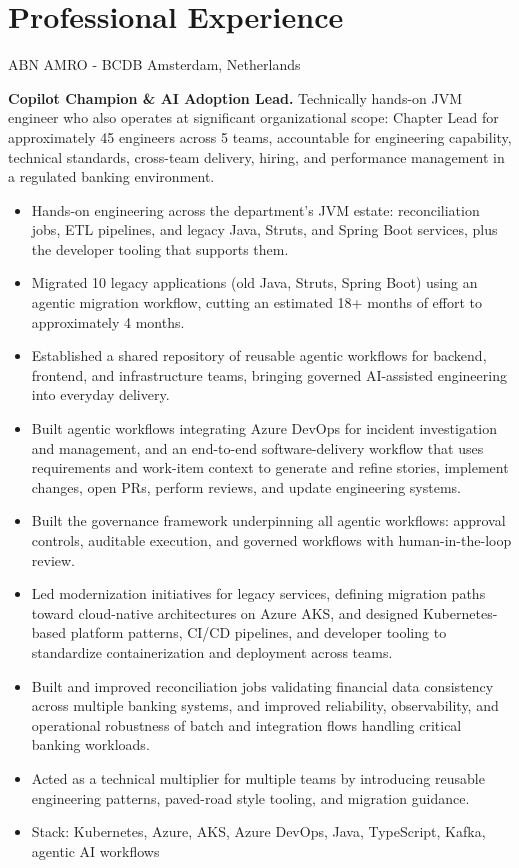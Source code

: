 \documentclass[10pt,a4paper,sans]{moderncv}
\begin{document}
\section{Professional Experience}
{ABN AMRO - BCDB}
{Amsterdam, Netherlands}
{}{\textbf{Copilot Champion \& AI Adoption Lead.} Technically hands-on JVM engineer who also operates at significant organizational scope: Chapter Lead for approximately 45 engineers across 5 teams, accountable for engineering capability, technical standards, cross-team delivery, hiring, and performance management in a regulated banking environment.
\begin{itemize}
 \item Hands-on engineering across the department's JVM estate: reconciliation jobs, ETL pipelines, and legacy Java, Struts, and Spring Boot services, plus the developer tooling that supports them.
 \item Migrated 10 legacy applications (old Java, Struts, Spring Boot) using an agentic migration workflow, cutting an estimated 18+ months of effort to approximately 4 months.
 \item Established a shared repository of reusable agentic workflows for backend, frontend, and infrastructure teams, bringing governed AI-assisted engineering into everyday delivery.
 \item Built agentic workflows integrating Azure DevOps for incident investigation and management, and an end-to-end software-delivery workflow that uses requirements and work-item context to generate and refine stories, implement changes, open PRs, perform reviews, and update engineering systems.
 \item Built the governance framework underpinning all agentic workflows: approval controls, auditable execution, and governed workflows with human-in-the-loop review.
 \item Led modernization initiatives for legacy services, defining migration paths toward cloud-native architectures on Azure AKS, and designed Kubernetes-based platform patterns, CI/CD pipelines, and developer tooling to standardize containerization and deployment across teams.
 \item Built and improved reconciliation jobs validating financial data consistency across multiple banking systems, and improved reliability, observability, and operational robustness of batch and integration flows handling critical banking workloads.
 \item Acted as a technical multiplier for multiple teams by introducing reusable engineering patterns, paved-road style tooling, and migration guidance.
 \item Stack: Kubernetes, Azure, AKS, Azure DevOps, Java, TypeScript, Kafka, agentic AI workflows
\end{itemize}
}
\end{document}
